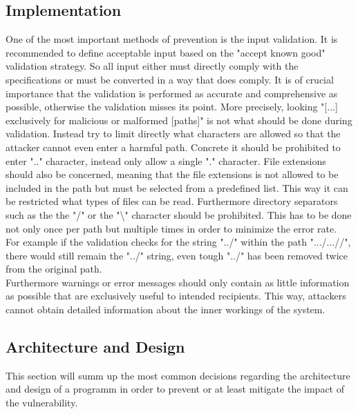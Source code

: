 \subsection{Implementation}
\label{implementation}
One of the most important methods of prevention is the input validation. It is recommended to define acceptable input based on the "accept known good" validation strategy. So all input either must directly comply with the specifications or must be converted in a way that does comply. It is of crucial importance that the validation is performed as accurate and comprehensive as possible, otherwise the validation misses its point. More precisely, looking "[...] exclusively for malicious or malformed [paths]" \autocite{CWE22-Definition:online} is not what should be done during validation. Instead try to limit directly what characters are allowed so that the attacker cannot even enter a harmful path. Concrete it should be prohibited to enter ".." character, instead only allow a single "." character. File extensions should also be concerned, meaning that the file extensions is not allowed to be included in the path but must be selected from a predefined list. This way it can be restricted what types of files can be read. Furthermore directory separators such as the the "/" or the "\textbackslash" character should be prohibited. This has to be done not only once per path but multiple times in order to minimize the error rate. For example if the validation checks for the string "../" within the path ".../...//", there would still remain the "../" string, even tough "../" has been removed twice from the original path. \autocite{CWE22-Definition:online}\\
Furthermore warnings or error messages should only contain as little information as possible that are exclusively useful to intended recipients. This way, attackers cannot obtain detailed information about the inner workings of the system. \autocite{CWE22-Definition:online}

\subsection{Architecture and Design}
\label{design}
This section will summ up the most common decisions regarding the architecture and design of a programm in order to prevent or at least mitigate the impact of the vulnerability.

